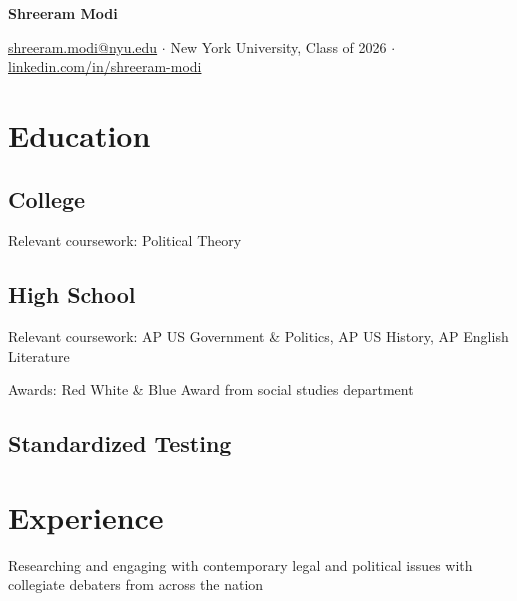 \documentclass[letterpaper]{resume-shreeram}
\begin{document}
\begin{center}
  {\Huge \bfseries Shreeram Modi}

  \href{mailto:shreeram.modi@nyu.edu}{shreeram.modi@nyu.edu}
  $\cdot$
  New York University, Class of 2026
  $\cdot$
  \href{https://linkedin.com/in/shreeram-modi}{linkedin.com/in/shreeram-modi}
\end{center}

\section{Education}

\subsection{College}

\begin{compactitem}
  \item Relevant coursework: Political Theory
\end{compactitem}

\subsection{High School}

\begin{compactitem}
  \item Relevant coursework: AP US Government \& Politics, AP US
    History, AP English Literature

  \item Awards: Red White \& Blue Award from social studies department
\end{compactitem}

\subsection{Standardized Testing}


\section{Experience}

\begin{compactitem}
  \item Researching and engaging with contemporary legal and political
    issues with collegiate debaters from across the nation
\end{compactitem}
\end{document}
